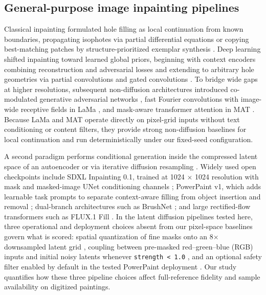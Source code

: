 \documentclass[applsci,article,submit,pdftex,moreauthors]{Definitions/mdpi}
\begin{document}
\subsection{General-purpose image inpainting pipelines}\label{general-purpose-image-inpainting-pipelines}

Classical inpainting formulated hole filling as local continuation from known boundaries, propagating isophotes via partial differential equations \citep{bertalmio2000} or copying best-matching patches by structure-prioritized exemplar synthesis \citep{criminisi2004}. Deep learning shifted inpainting toward learned global priors, beginning with context encoders combining reconstruction and adversarial losses \citep{pathak2016} and extending to arbitrary hole geometries via partial convolutions \citep{liu2018} and gated convolutions \citep{yu2018}. To bridge wide gaps at higher resolutions, subsequent non-diffusion architectures introduced co-modulated generative adversarial networks \citep{zhao2021}, fast Fourier convolutions with image-wide receptive fields in LaMa \citep{suvorov2021}, and mask-aware transformer attention in MAT \citep{li2022mat}. Because LaMa and MAT operate directly on pixel-grid inputs without text conditioning or content filters, they provide strong non-diffusion baselines for local continuation and run deterministically under our fixed-seed configuration.

A second paradigm performs conditional generation inside the compressed latent space of an autoencoder \citep{rombach2021} or via iterative diffusion resampling \citep{lugmayr2022}. Widely used open checkpoints include SDXL Inpainting 0.1, trained at 1024 \ensuremath{\times} 1024 resolution with mask and masked-image UNet conditioning channels \citep{sdxlinpaint}; PowerPaint v1, which adds learnable task prompts to separate context-aware filling from object insertion and removal \citep{zhuang2023}; dual-branch architectures such as BrushNet \citep{ju2024}; and large rectified-flow transformers such as FLUX.1 Fill \citep{fluxfill}. In the latent diffusion pipelines tested here, three operational and deployment choices absent from our pixel-space baselines govern what is scored: spatial quantization of fine masks onto an 8\ensuremath{\times} downsampled latent grid \citep{shamsolmoali2025tdpaint, ju2024, diffuserssdxl0352, powerpaintv1src}, coupling between pre-masked red--green--blue (RGB) inputs and initial noisy latents whenever \texttt{strength\ \textless{}\ 1.0} \citep{diffuserssdxl0352, diffusers8450}, and an optional safety filter enabled by default in the tested PowerPaint deployment \citep{zhuang2023, powerpaintv1src}. Our study quantifies how these three pipeline choices affect full-reference fidelity and sample availability on digitized paintings.
\end{document}
